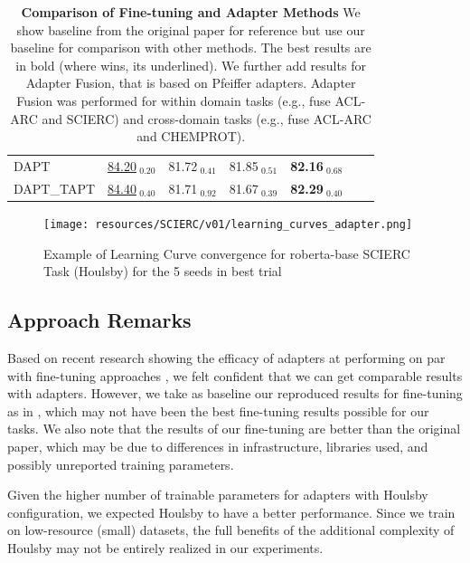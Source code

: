 \documentclass[10pt,twocolumn,letterpaper]{article}
\begin{document}
\begin{table}[h]
\begin{tabular}{@{}lcc|lc|cc|@{}}
    DAPT & \underline{84.20}$_{\text{ 0.20}}$ & 81.72$_{\text{ 0.41}}$ & 81.85$_{\text{ 0.51}}$ & \textbf{82.16}$_{\text{ 0.68}}$ & & \\ 
    DAPT\_TAPT & \underline{84.40}$_{\text{ 0.40}}$ & 81.71$_{\text{ 0.92}}$ & 81.67$_{\text{ 0.39}}$ & \textbf{82.29}$_{\text{ 0.40}}$ & & \\
    \bottomrule
    \end{tabular}
    \caption{\textbf{Comparison of Fine-tuning and Adapter Methods} We show baseline from the original paper \cite{gururangan2020dont} for reference but use our baseline for comparison with other methods. The best results are in bold (where \cite{gururangan2020dont} wins, its underlined). We further add results for Adapter Fusion, that is based on Pfeiffer adapters. Adapter Fusion was performed for within domain tasks (e.g., fuse ACL-ARC and SCIERC) and cross-domain tasks (e.g., fuse ACL-ARC and CHEMPROT).}
    \label{table:aclarc}
\end{table}


\begin{figure}[h]
    \centering 
    \texttt{[image: resources/SCIERC/v01/learning\_curves\_adapter.png]}
    \caption{Example of Learning Curve convergence for roberta-base SCIERC Task (Houlsby) for the 5 seeds in best trial}
    \label{fig:learning_curve}
\end{figure}
\subsection{Approach Remarks} 
Based on recent research showing the efficacy of adapters at performing on par with fine-tuning approaches \cite{houlsby2019parameter}, we felt confident that we can get comparable results with adapters. However, we take as baseline our reproduced results for fine-tuning as in \cite{gururangan2020dont}, which may not have been the best fine-tuning results possible for our tasks. We also note that the results of our fine-tuning are better than the original paper, which may be due to differences in infrastructure, libraries used, and possibly unreported training parameters.

Given the higher number of trainable parameters for adapters with Houlsby configuration, we expected Houlsby to have a better performance. Since we train on low-resource (small) datasets, the full benefits of the additional complexity of Houlsby may not be entirely realized in our experiments.
\end{document}
